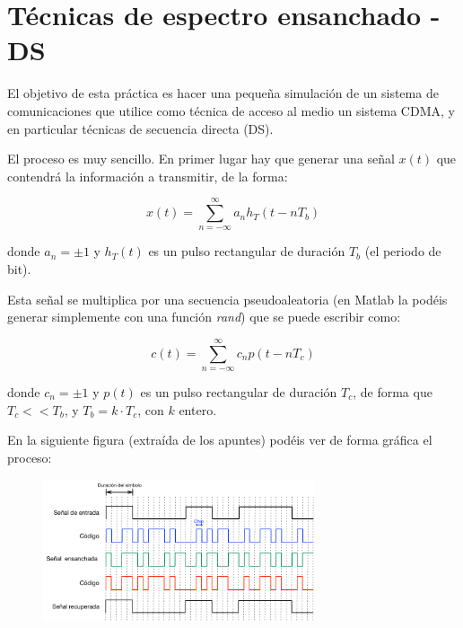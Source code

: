 \documentclass[es,practica]{uah}
\begin{document}

\maketitle

\section{Técnicas de espectro ensanchado - DS}

El objetivo de esta práctica es hacer una pequeña simulación de un sistema de comunicaciones que utilice como técnica de acceso al medio un sistema CDMA, y en particular técnicas de secuencia directa (DS). 

El proceso es muy sencillo. En primer lugar hay que generar una señal $x(t)$ que contendrá la información a transmitir, de la forma:

\begin{equation}
	x(t) = \sum_{n=-\infty}^{\infty} a_n h_T(t - nT_b)
\end{equation}

donde $a_n = \pm 1$ y $h_T(t)$ es un pulso rectangular de duración $T_b$ (el periodo de bit).

Esta señal se multiplica por una secuencia pseudoaleatoria (en Matlab la podéis generar simplemente con una función \emph{rand}) que se puede escribir como:

\begin{equation}
	c(t) = \sum_{n=-\infty}^{\infty} c_n p(t - nT_c)
\end{equation}

donde $c_n=\pm 1$ y $p(t)$ es un pulso rectangular de duración $T_c$, de forma que $T_c << T_b$, y $T_b = k\cdot T_c$, con $k$ entero. 

En la siguiente figura (extraída de los apuntes) podéis ver de forma gráfica el proceso: 

\begin{figure}[h!]
	\centering\includegraphics[width=8cm]{../Apuntes/Figuras/DS-CDMA}
\end{figure}
\end{document}
